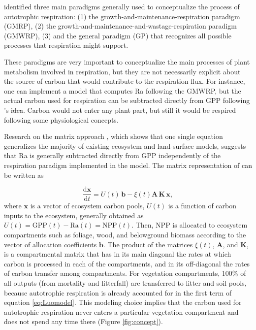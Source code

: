 \documentclass[bg, manuscript]{copernicus}
\providecommand{\DIFadd}[1]{{\protect\color{blue}\uwave{#1}}} %
\providecommand{\DIFdel}[1]{{\protect\color{red}\sout{#1}}}                      %
\providecommand{\DIFaddbegin}{} %
\providecommand{\DIFaddend}{} %
\providecommand{\DIFdelbegin}{} %
\providecommand{\DIFdelend}{} %
\begin{document}
\citet{Amthor2000} identified three main paradigms generally used to conceptualize the process of autotrophic respiration: (1) the growth-and-maintenance-respiration paradigm (GMRP), (2) the growth-and-maintenance-and-wastage-respiration paradigm (GMWRP), (3) and the general paradigm (GP) that recognizes all possible processes that respiration might support. 

These paradigms are very important to conceptualize the main processes of plant metabolism involved in respiration, but they are not necessarily explicit about the source of carbon that would contribute to the respiration flux. For instance, one can implement a model that computes Ra following the GMWRP, but the actual carbon used for respiration can be subtracted directly from GPP following \citeauthor{Waring1998}'s \citeyearpar{Waring1998} \DIFdelbegin \DIFdel{idea}\DIFdelend \DIFaddbegin \DIFadd{approach}\DIFaddend . Carbon would not enter any plant part, but still it would be respired following some physiological concepts. 

Research on the matrix approach \citep{Luo2017}, which shows that one single equation generalizes the majority of existing ecosystem and land-surface models, suggests that Ra is generally subtracted directly from GPP independently of the respiration paradigm implemented in the model.
The matrix representation of \citet{Luo2017} can be written as

\begin{equation} \label{eq:Luomodel}
\frac{\mathrm{d} \bm{x}}{\mathrm{d}t} =  U(t) \, \bm{b} - \xi(t) \mathbf{A} \, \mathbf{K} \, \bm{x},
\end{equation}
where $\bm{x}$ is a vector of ecosystem carbon pools, $U(t)$ is a function of carbon inputs to the ecosystem, generally obtained as $U(t) = \mathrm{GPP}(t) - \mathrm{Ra}(t) = \mathrm{NPP}(t)$. Then, NPP is allocated to ecosystem compartments such as foliage, wood, and belowground biomass according to the vector of allocation coefficients $\bm{b}$. The product of the matrices $\xi(t)$,  $\mathbf{A}$, and $\mathbf{K}$, is a compartmental matrix that has in its main diagonal the rates at which carbon is processed in each of the compartments, and in its off-diagonal the rates of carbon transfer among compartments. For vegetation compartments, 100\% of all outputs (from mortality and litterfall) are transferred to litter and soil pools, because autotrophic  respiration is already accounted for in the first term of  equation \eqref{eq:Luomodel}. This modeling choice implies that the carbon used for autotrophic respiration never enters a particular vegetation compartment and does not spend any time there (Figure \ref{fig:concept}).
\end{document}
